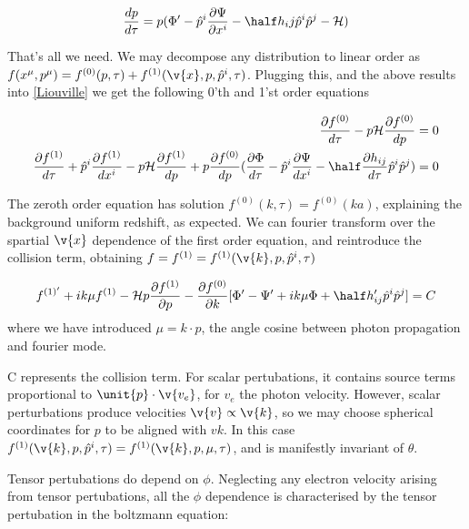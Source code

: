 \begin{equation}
\frac{dp}{d\tau} = p (\Phi' - \hat{p}^i\frac{\partial \Psi}{\partial x^i} -\half h_ij\hat{p}^i\hat{p}^j -\mathcal{H})
\end{equation}

That's all we need. We may decompose any distribution to linear order as $f(x^\mu, p^\mu) = f^{(0)}(p,\tau) + f^{(1)}(\v{x},p,\hat{p}^i,\tau)$. Plugging this, and the above results into \ref{Liouville} we get the following 0'th and 1'st order equations

\begin{equation}\begin{split}
\frac{\partial f^{(0)}}{d\tau} - p\mathcal{H}\frac{\partial f^{(0)}}{dp} &=0\\
\frac{\partial f^{(1)}}{d\tau} + \hat{p}^i\frac{\partial f^{(1)}}{dx^i} - p\mathcal{H}\frac{\partial f^{(1)}}{dp} +p\frac{\partial f^{(0)}}{dp}(\frac{\partial\Phi}{d\tau}-\hat{p}^i\frac{\partial \Psi}{dx^i}-\half \frac{\partial h_{ij}}{d\tau}\hat{p}^i\hat{p}^j) &=0
\end{split}\end{equation}

The zeroth order equation has solution $f^{(0)}(k,\tau) = f^{(0)}(ka)$, explaining the background uniform redshift, as expected. We can fourier transform over the spartial $\v{x}$ dependence of the first order equation, and reintroduce the collision term, obtaining $f = f^{(1)} = f^{(1)}(\v{k}, p, \hat{p}^i, \tau)$

\begin{equation}
f^{(1)'} + ik\mu f^{(1)}-\mathcal{H}p\frac{\partial f^{(1)}}{\partial p} - \frac{\partial f^{(0)}}{\partial k} [ \Phi ' - \Psi ' + ik\mu \Phi + \half h_{ij}'\hat{p}^i\hat{p}^j] = 
C
\end{equation}
where we have introduced $\mu = \unit{k} \cdot \unit{p}$, the angle cosine between photon propagation and fourier mode.

C represents the collision term. For scalar pertubations, it contains source terms proportional to $\unit{p}\cdot\v{v_e}$, for $v_e$ the photon velocity. However, scalar perturbations produce velocities $\v{v} \propto \v{k}$, so we may choose spherical coordinates for $\unit{p}$ to be aligned with $v{k}$. In this case  $f^{(1)}(\v{k}, p, \hat{p}^i, \tau) = f^{(1)}(\v{k}, p, \mu, \tau)$, and is manifestly invariant of $\theta$.

Tensor pertubations do depend on $\phi$. Neglecting any electron velocity arising from tensor pertubations, all the $\phi$ dependence is characterised by the tensor pertubation in the boltzmann equation:

